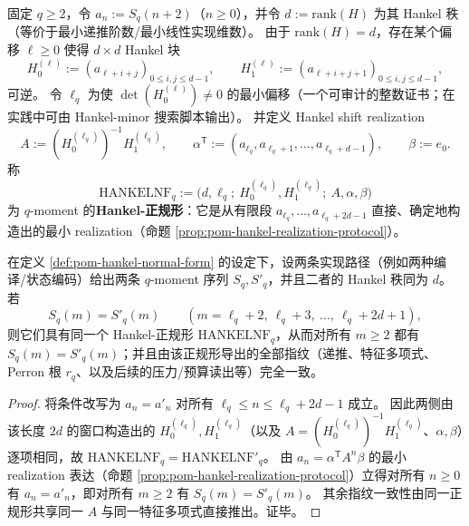 \begin{definition}\label{def:pom-hankel-normal-form}
固定 \(q\ge 2\)，令 \(a_n:=S_q(n+2)\)（\(n\ge 0\)），并令 \(d:=\mathrm{rank}(H)\) 为其 Hankel 秩（等价于最小递推阶数/最小线性实现维数）。
由于 \(\mathrm{rank}(H)=d\)，存在某个偏移 \(\ell\ge 0\) 使得 \(d\times d\) Hankel 块
\[
H_0^{(\ell)}:=(a_{\ell+i+j})_{0\le i,j\le d-1},
\qquad
H_1^{(\ell)}:=(a_{\ell+i+j+1})_{0\le i,j\le d-1},
\]
可逆。
令 \(\ell_q\) 为使 \(\det(H_0^{(\ell)})\neq 0\) 的最小偏移（一个可审计的整数证书；在实践中可由 Hankel-minor 搜索脚本输出）。
并定义 Hankel shift realization
\[
A:=(H_0^{(\ell_q)})^{-1}H_1^{(\ell_q)},
\qquad
\alpha^{\mathsf T}:=(a_{\ell_q},a_{\ell_q+1},\dots,a_{\ell_q+d-1}),
\qquad
\beta:=e_0.
\]
称
\[
\boxed{\;
\mathrm{HANKELNF}_q:=\bigl(d,\ell_q;\ H_0^{(\ell_q)},H_1^{(\ell_q)};\ A,\alpha,\beta\bigr)\;}
\]
为 \(q\)-moment 的\textbf{Hankel-正规形}：它是从有限段 \(a_{\ell_q},\dots,a_{\ell_q+2d-1}\) 直接、确定地构造出的最小 realization（命题 \ref{prop:pom-hankel-realization-protocol}）。
\end{definition}

\begin{proposition}\label{prop:pom-moment-finite-sampling-decidable}
在定义 \ref{def:pom-hankel-normal-form} 的设定下，设两条实现路径（例如两种编译/状态编码）给出两条 \(q\)-moment 序列 \(S_q,S'_q\)，并且二者的 Hankel 秩同为 \(d\)。
若
\[
S_q(m)=S'_q(m)\qquad(m=\ell_q+2,\ \ell_q+3,\ \dots,\ \ell_q+2d+1),
\]
则它们具有同一个 Hankel-正规形 \(\mathrm{HANKELNF}_q\)，从而对所有 \(m\ge 2\) 都有 \(S_q(m)=S'_q(m)\)；并且由该正规形导出的全部指纹（递推、特征多项式、Perron 根 \(r_q\)、以及后续的压力/预算读出等）完全一致。
\end{proposition}
\begin{proof}
将条件改写为 \(a_n=a'_n\) 对所有 \(\ell_q\le n\le \ell_q+2d-1\) 成立。
因此两侧由该长度 \(2d\) 的窗口构造出的 \(H_0^{(\ell_q)},H_1^{(\ell_q)}\)（以及 \(A=(H_0^{(\ell_q)})^{-1}H_1^{(\ell_q)}\)、\(\alpha,\beta\)）逐项相同，故 \(\mathrm{HANKELNF}_q=\mathrm{HANKELNF}'_q\)。
由 \(a_n=\alpha^{\mathsf T}A^n\beta\) 的最小 realization 表达（命题 \ref{prop:pom-hankel-realization-protocol}）立得对所有 \(n\ge 0\) 有 \(a_n=a'_n\)，即对所有 \(m\ge 2\) 有 \(S_q(m)=S'_q(m)\)。
其余指纹一致性由同一正规形共享同一 \(A\) 与同一特征多项式直接推出。证毕。
\end{proof}

